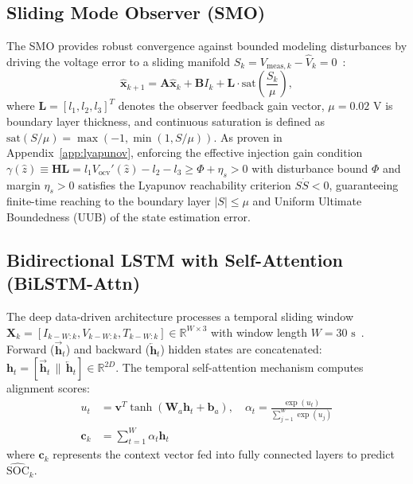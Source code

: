 \documentclass[balance,nocopyright,upint,varvw,hyphenate,barcolor=NavyBlue,nolists]{asmejour}
\begin{document}
\subsection{Sliding Mode Observer (SMO)}
The SMO provides robust convergence against bounded modeling disturbances by driving the voltage error to a sliding manifold $S_k = V_{\text{meas},k} - \hat{V}_k = 0$~\cite{Kim2011,Chen2016smo}:
\begin{equation}\label{eqn:smo_state_eq}
\hat{\mathbf{x}}_{k+1} = \mathbf{A} \hat{\mathbf{x}}_k + \mathbf{B} I_k + \mathbf{L} \cdot \text{sat}\left( \frac{S_k}{\mu} \right),
\end{equation}
where $\mathbf{L} = [l_1, l_2, l_3]^T$ denotes the observer feedback gain vector, $\mu = 0.02\text{ V}$ is boundary layer thickness, and continuous saturation is defined as $\text{sat}(S/\mu) = \max(-1, \min(1, S/\mu))$. As proven in Appendix~\ref{app:lyapunov}, enforcing the effective injection gain condition $\gamma(\hat{z}) \equiv \mathbf{H} \mathbf{L} = l_1 V_{\text{ocv}}'(\hat{z}) - l_2 - l_3 \ge \Phi + \eta_s > 0$ with disturbance bound $\Phi$ and margin $\eta_s > 0$ satisfies the Lyapunov reachability criterion $S \dot{S} < 0$, guaranteeing finite-time reaching to the boundary layer $|S| \le \mu$ and Uniform Ultimate Boundedness (UUB) of the state estimation error.

\subsection{Bidirectional LSTM with Self-Attention (BiLSTM-Attn)}
The deep data-driven architecture processes a temporal sliding window $\mathbf{X}_k = [I_{k-W:k}, V_{k-W:k}, T_{k-W:k}] \in \mathbb{R}^{W \times 3}$ with window length $W = 30\text{ s}$~\cite{Song2019bilstm,Vaswani2017attention}. Forward ($\overrightarrow{\mathbf{h}}_t$) and backward ($\overleftarrow{\mathbf{h}}_t$) hidden states are concatenated: $\mathbf{h}_t = [\overrightarrow{\mathbf{h}}_t \,\|\, \overleftarrow{\mathbf{h}}_t] \in \mathbb{R}^{2 D}$. The temporal self-attention mechanism computes alignment scores:
\begin{align}
u_t &= \mathbf{v}^T \tanh(\mathbf{W}_a \mathbf{h}_t + \mathbf{b}_a), \quad \alpha_t = \frac{\exp(u_t)}{\sum_{j=1}^W \exp(u_j)} \label{eqn:attn_weight}\\
\mathbf{c}_k &= \sum_{t=1}^W \alpha_t \mathbf{h}_t \label{eqn:attn_context}
\end{align}
where $\mathbf{c}_k$ represents the context vector fed into fully connected layers to predict $\widehat{\text{SOC}}_k$.
\end{document}
